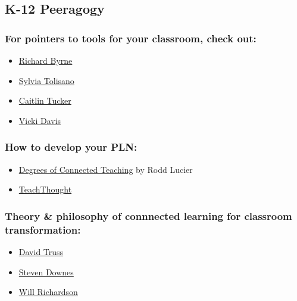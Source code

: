 \hypertarget{k-12-peeragogy}{%
\subsection{K-12 Peeragogy}\label{k-12-peeragogy}}

\hypertarget{for-pointers-to-tools-for-your-classroom-check-out}{%
\subsubsection{For pointers to tools for your classroom, check
out:}\label{for-pointers-to-tools-for-your-classroom-check-out}}

\begin{itemize}
\tightlist
\item
  \href{http://www.freetech4teachers.com/}{Richard Byrne}
\item
  \href{http://langwitches.org/blog/}{Sylvia Tolisano}
\item
  \href{http://catlintucker.com/2011/11/12-tech-tools-that-will-transform-your-classroom/}{Caitlin
  Tucker}
\item
  \href{http://coolcatteacher.blogspot.ca/}{Vicki Davis}
\end{itemize}

\hypertarget{how-to-develop-your-pln}{%
\subsubsection{How to develop your PLN:}\label{how-to-develop-your-pln}}

\begin{itemize}
\tightlist
\item
  \href{http://thecleversheep.blogspot.ca/2012/06/seven-degrees-of-connectedness_06.html}{Degrees
  of Connected Teaching} by Rodd Lucier
\item
  \href{http://thecleversheep.blogspot.ca/2012/06/seven-degrees-of-connectedness_06.html}{TeachThought}
\end{itemize}

\hypertarget{theory-philosophy-of-connnected-learning-for-classroom-transformation}{%
\subsubsection{Theory \& philosophy of connnected learning for classroom
transformation:}\label{theory-philosophy-of-connnected-learning-for-classroom-transformation}}

\begin{itemize}
\tightlist
\item
  \href{http://pairadimes.davidtruss.com/}{David Truss}
\item
  \href{http://www.downes.ca/presentation/264}{Steven Downes}
\item
  \href{http://willrichardson.com/}{Will Richardson}
\end{itemize}

